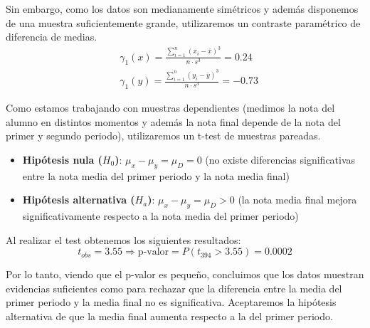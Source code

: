 \pagebreak

Sin embargo, como los datos son medianamente simétricos y además disponemos de una muestra suficientemente grande, utilizaremos un contraste paramétrico de diferencia de medias.
\begin{equation*}
    \begin{split}
        & \gamma_{1}(x) = \frac{\sum_{i=1}^{n}(x_i - \bar{x})^3}{n \cdot s^3} = 0.24\\
        & \gamma_{1}(y) = \frac{\sum_{i=1}^{n}(y_i - \bar{y})^3}{n \cdot s^3} = -0.73
    \end{split} 
\end{equation*}

Como estamos trabajando con muestras dependientes (medimos la nota del alumno en distintos momentos y además la nota final depende de la nota del primer y segundo periodo), utilizaremos un t-test de muestras pareadas.
\begin{itemize}
    \item \textbf{Hipótesis nula ($H_0$)}: $\mu_x - \mu_y = \mu_D = 0$ (no existe diferencias significativas entre la nota media del primer periodo y la nota media final)
    \item \textbf{Hipótesis alternativa ($H_a$)}: $\mu_x - \mu_y = \mu_D > 0$ (la nota media final mejora significativamente respecto a la nota media del primer periodo)
\end{itemize}

Al realizar el test obtenemos los siguientes resultados:
\begin{equation*}
    t_{obs} = 3.55 \Rightarrow \text{p-valor} = P(t_{394} > 3.55) = 0.0002
\end{equation*}

Por lo tanto, viendo que el p-valor es pequeño, concluimos que los datos muestran evidencias suficientes como para rechazar que la diferencia entre la media del primer periodo y la media final no es significativa. Aceptaremos la hipótesis alternativa de que la media final aumenta respecto a la del primer periodo.
